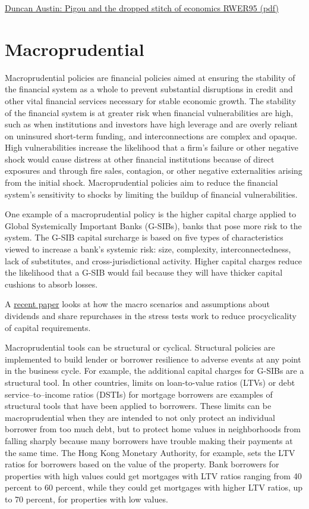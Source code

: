 \documentclass[
]{book}
\begin{document}
\href{pdf/Austin_2021_Pigou_\%20and_the_dropped_stitch_of_economics_RWER95.pdf}{Duncan Austin: Pigou and the dropped stitch of economics RWER95 (pdf)}

\hypertarget{macroprudential}{%
\section{Macroprudential}\label{macroprudential}}

Macroprudential policies are financial policies aimed at ensuring the stability of the financial system as a whole to prevent substantial disruptions in credit and other vital financial services necessary for stable economic growth. The stability of the financial system is at greater risk when financial vulnerabilities are high, such as when institutions and investors have high leverage and are overly reliant on uninsured short-term funding, and interconnections are complex and opaque. High vulnerabilities increase the likelihood that a firm's failure or other negative shock would cause distress at other financial institutions because of direct exposures and through fire sales, contagion, or other negative externalities arising from the initial shock. Macroprudential policies aim to reduce the financial system's sensitivity to shocks by limiting the buildup of financial vulnerabilities.

One example of a macroprudential policy is the higher capital charge applied to Global Systemically Important Banks (G-SIBs), banks that pose more risk to the system. The G-SIB capital surcharge is based on five types of characteristics viewed to increase a bank's systemic risk: size, complexity, interconnectedness, lack of substitutes, and cross-jurisdictional activity. Higher capital charges reduce the likelihood that a G-SIB would fail because they will have thicker capital cushions to absorb losses.

A \href{https://www.brookings.edu/research/understanding-the-effects-of-the-u-s-stress-tests/}{recent paper} looks at how the macro scenarios and assumptions about dividends and share repurchases in the stress tests work to reduce procyclicality of capital requirements.

Macroprudential tools can be structural or cyclical. Structural policies are implemented to build lender or borrower resilience to adverse events at any point in the business cycle. For example, the additional capital charges for G-SIBs are a structural tool. In other countries, limits on loan-to-value ratios (LTVs) or debt service--to--income ratios (DSTIs) for mortgage borrowers are examples of structural tools that have been applied to borrowers. These limits can be macroprudential when they are intended to not only protect an individual borrower from too much debt, but to protect home values in neighborhoods from falling sharply because many borrowers have trouble making their payments at the same time. The Hong Kong Monetary Authority, for example, sets the LTV ratios for borrowers based on the value of the property. Bank borrowers for properties with high values could get mortgages with LTV ratios ranging from 40 percent to 60 percent, while they could get mortgages with higher LTV ratios, up to 70 percent, for properties with low values.
\end{document}
